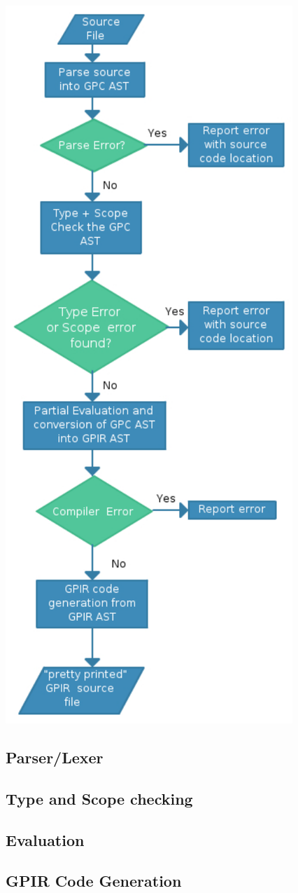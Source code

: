 \begin{center}
\includegraphics{graphs/Dissertation.pdf}
\end{center}
    
\subsection{Parser/Lexer}
\subsection{Type and Scope checking}
\subsection{Evaluation}
\subsection{GPIR Code Generation}
